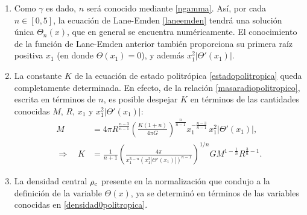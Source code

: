\begin{enumerate}
 \item Como $\gamma$ es dado, $n$ será conocido mediante \eqref{ngamma}. Así, por cada $n\in[0,5]$, la ecuación de Lane-Emden \eqref{laneemden} tendrá una solución única $\Theta_n(x)$, que en general se encuentra numéricamente. El conocimiento de la función de Lane-Emden anterior también proporciona su primera raíz positiva $x_1$ (en donde $\Theta(x_1)=0$), y además $x_1^2\left|\Theta'(x_1)\right|$.
\item La constante $K$ de la ecuación de estado politrópica \eqref{estadopolitropica} queda completamente determinada. En efecto, de la relación \eqref{masaradiopolitropico}, escrita en términos de $n$, es posible despejar $K$ en términos de las cantidades conocidas $M$, $R$, $x_1$ y $x_1^2\left|\Theta'(x_1)\right|$:
\begin{align}
M&=4\pi R^{\frac{n-3}{n-1}}\left(\frac{K(1+n)}{4\pi G}\right)^{\frac{n}{n-1}}x_1^{-\frac{n-3}{n-1}}\,x_1^2\left|\Theta'(x_1)\right|,\\
\Rightarrow\quad K&=\frac{1}{n+1}\left(\frac{4\pi}{x_1^{3-n} \left(x_1^2\left|\Theta'(x_1)\right|\right)^{n-1}}\right)^{1/n}GM^{1-\frac{1}{n}}R^{\frac{3}{n}-1}.\label{kpolitropico}
\end{align}

 \item La densidad central $\rho_{\rm c}$ presente en la normalización que condujo a la definición de la variable $\Theta(x)$, ya se determinó en términos de las variables conocidas en \eqref{densidad0politropica}.


\end{enumerate}
